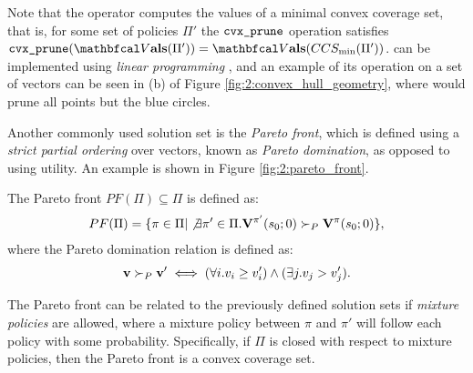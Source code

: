     Note that the \cprune\ewe operator computes the values of a minimal convex coverage set, that is, for some set of policies $\Pi'$ the ${\textnormal{\texttt{cvx\_prune}}}$ operation satisfies $\cprune(\valset(\Pi')) = \valset(CCS_{\min}(\Pi'))$. \cprune\ewe can be implemented using \textit{linear programming} \cite{cccs}, and an example of its operation on a set of vectors can be seen in (b) of Figure \ref{fig:2:convex_hull_geometry}, where \cprune\ewe would prune all points but the blue circles.

    \begin{mccorrection}
        Another commonly used solution set is the \textit{Pareto front}, which is defined using a \textit{strict partial ordering} over vectors, known as \textit{Pareto domination}, as opposed to using utility. An example is shown in Figure \ref{fig:2:pareto_front}.
        \begin{defn}
            \label{def:2:pareto_front}
            The \textnormal{Pareto front} $PF(\Pi)\subseteq\Pi$ is defined as:
            \begin{align}
                PF(\Pi) = \{\pi\in\Pi | \not\exists \pi'\in\Pi. \mathbf{V}^{\pi'}(s_0;0) \succ_P \mathbf{V}^{\pi}(s_0;0) \},
            \end{align}
            where the \textnormal{Pareto domination} relation is defined as:
            \begin{align}
                \mathbf{v} \succ_P \mathbf{v'} \iff (\forall i. v_i \geq v'_i) \land (\exists j. v_j > v'_j).
            \end{align}
        \end{defn}

        The Pareto front can be related to the previously defined solution sets if \textit{mixture policies} are allowed, where a mixture policy between $\pi$ and $\pi'$ will follow each policy with some probability. Specifically, if $\Pi$ is closed with respect to mixture policies, then the Pareto front is a convex coverage set.
    \end{mccorrection}

